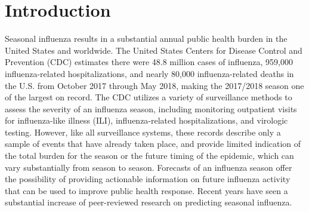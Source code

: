 \documentclass{article}\usepackage[]{graphicx}\usepackage[]{color}
\begin{document}
% 


\section{Introduction}


Seasonal influenza results in a substantial annual public health burden in the United States and worldwide.
The United States Centers for Disease Control and Prevention (CDC) estimates there were 48.8 million cases of influenza, 959,000 influenza-related hospitalizations, and nearly 80,000 influenza-related deaths in the U.S. from October 2017 through May 2018, making the 2017/2018 season one of the largest on record.\cite{CDC2018-estimates} 
The CDC utilizes a variety of surveillance methods to assess the severity of an influenza season, including monitoring outpatient visits for influenza-like illness (ILI), influenza-related hospitalizations, and virologic testing.\cite{surv2017} 
However, like all surveillance systems, these records describe only a sample of events that have already taken place, and provide limited indication of the total burden for the season or the future timing of the epidemic, which can vary substantially from season to season.\cite{CDC2018} 
Forecasts of an influenza season offer the possibility of providing actionable information on future influenza activity that can be used to improve public health response. 
Recent years have seen a substantial increase of peer-reviewed research on predicting seasonal influenza.\cite{Shaman2013,Yang2014,Yang2015,Chretien2016,Kandula2017,osthus2018dynamic,Brooks2018,Pei2018}
\end{document}
